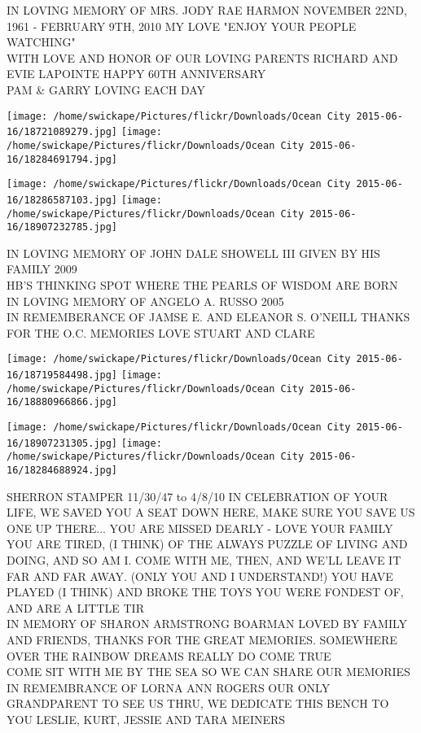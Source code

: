 \documentclass[10pt,letterpaper]{article}
\begin{document}
IN LOVING MEMORY OF MRS. JODY RAE HARMON NOVEMBER 22ND, 1961 {-} FEBRUARY 9TH, 2010 MY LOVE "ENJOY YOUR PEOPLE WATCHING"\\
WITH LOVE AND HONOR OF OUR LOVING PARENTS RICHARD AND EVIE LAPOINTE HAPPY 60TH ANNIVERSARY\\
PAM \& GARRY LOVING EACH DAY
\pagebreak

\texttt{[image: /home/swickape/Pictures/flickr/Downloads/Ocean City 2015-06-16/18721089279.jpg]}
\texttt{[image: /home/swickape/Pictures/flickr/Downloads/Ocean City 2015-06-16/18284691794.jpg]}

\texttt{[image: /home/swickape/Pictures/flickr/Downloads/Ocean City 2015-06-16/18286587103.jpg]}
\texttt{[image: /home/swickape/Pictures/flickr/Downloads/Ocean City 2015-06-16/18907232785.jpg]}

IN LOVING MEMORY OF JOHN DALE SHOWELL III GIVEN BY HIS FAMILY 2009\\
HB'S THINKING SPOT WHERE THE PEARLS OF WISDOM ARE BORN\\
IN LOVING MEMORY OF ANGELO A. RUSSO 2005\\
IN REMEMBERANCE OF JAMSE E. AND ELEANOR S. O'NEILL THANKS FOR THE O.C. MEMORIES LOVE STUART AND CLARE
\pagebreak

\texttt{[image: /home/swickape/Pictures/flickr/Downloads/Ocean City 2015-06-16/18719584498.jpg]}
\texttt{[image: /home/swickape/Pictures/flickr/Downloads/Ocean City 2015-06-16/18880966866.jpg]}

\texttt{[image: /home/swickape/Pictures/flickr/Downloads/Ocean City 2015-06-16/18907231305.jpg]}
\texttt{[image: /home/swickape/Pictures/flickr/Downloads/Ocean City 2015-06-16/18284688924.jpg]}

SHERRON STAMPER 11/30/47 to 4/8/10 IN CELEBRATION OF YOUR LIFE, WE SAVED YOU A SEAT DOWN HERE, MAKE SURE YOU SAVE US ONE UP THERE...  YOU ARE MISSED DEARLY {-} LOVE YOUR FAMILY\\
YOU ARE TIRED, (I THINK) OF THE ALWAYS PUZZLE OF LIVING AND DOING, AND SO AM I.  COME WITH ME, THEN, AND WE'LL LEAVE IT FAR AND FAR AWAY.  (ONLY YOU AND I UNDERSTAND!)  YOU HAVE PLAYED (I THINK) AND BROKE THE TOYS YOU WERE FONDEST OF, AND ARE A LITTLE TIR\\
IN MEMORY OF SHARON ARMSTRONG BOARMAN LOVED BY FAMILY AND FRIENDS, THANKS FOR THE GREAT MEMORIES.  SOMEWHERE OVER THE RAINBOW DREAMS REALLY DO COME TRUE\\
COME SIT WITH ME BY THE SEA SO WE CAN SHARE OUR MEMORIES IN REMEMBRANCE OF LORNA ANN ROGERS OUR ONLY GRANDPARENT TO SEE US THRU, WE DEDICATE THIS BENCH TO YOU LESLIE, KURT, JESSIE AND TARA MEINERS
\pagebreak
\end{document}
